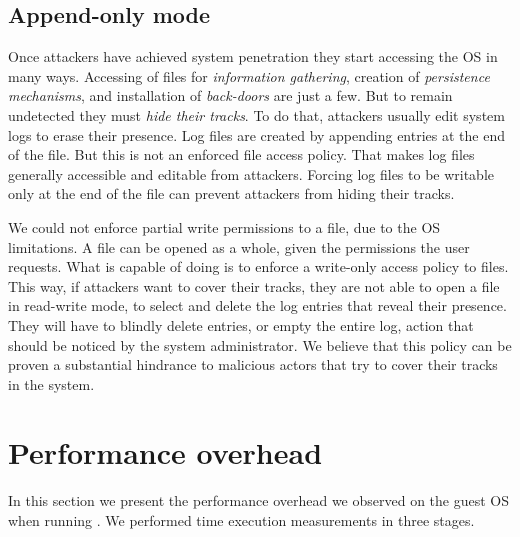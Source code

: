 \subsection{Append-only mode}

\par Once attackers have achieved system penetration they start accessing the \ac{OS} in many ways. Accessing of files for \emph{information gathering}, creation of \emph{persistence mechanisms}, and installation of \emph{back-doors} are just a few. But to remain undetected they must \emph{hide their tracks}. To do that, attackers usually edit system logs to erase their presence. Log files are created by appending entries at the end of the file. But this is not an enforced file access policy. That makes log files generally accessible and editable from attackers. Forcing log files to be writable only at the end of the file can prevent attackers from hiding their tracks.

\par We could not enforce partial write permissions to a file, due to the \ac{OS} limitations. A file can be opened as a whole, given the permissions the user requests. What  is capable of doing is to enforce a write-only access policy to files. This way, if attackers want to cover their tracks, they are not able to open a file in read-write mode, to select and delete the log entries that reveal their presence. They will have to blindly delete entries, or empty the entire log, action that should be noticed by the system administrator. We believe that this policy can be proven a substantial hindrance to malicious actors that try to cover their tracks in the system.

\section{Performance overhead}\label{sec:performance}

In this section we present the performance overhead we observed on the guest \ac{OS} when running . We performed time execution measurements in three stages. 


